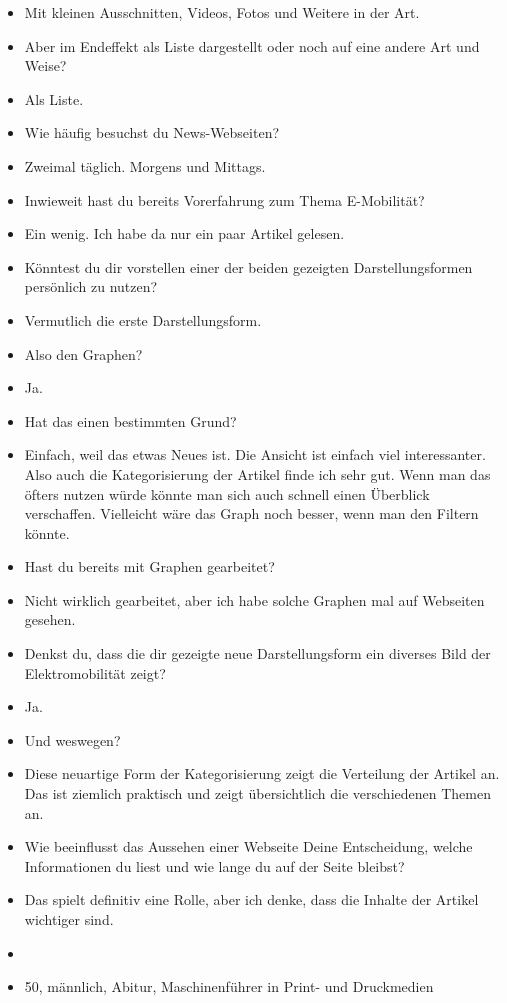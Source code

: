 {\begin{itemize}[]
            \item {} Mit kleinen Ausschnitten, Videos, Fotos und Weitere in der Art.
            \item {} Aber im Endeffekt als Liste dargestellt oder noch auf eine andere Art und Weise?
            \item {} Als Liste.
            \item {} Wie häufig besuchst du News-Webseiten?
            \item {} Zweimal täglich. Morgens und Mittags.
            \item {} Inwieweit hast du bereits Vorerfahrung zum Thema E-Mobilität?
            \item {} Ein wenig. Ich habe da nur ein paar Artikel gelesen.
            \item {} Könntest du dir vorstellen einer der beiden gezeigten Darstellungsformen persönlich zu nutzen?
            \item {} Vermutlich die erste Darstellungsform.
            \item {} Also den Graphen?
            \item {} Ja.
            \item {} Hat das einen bestimmten Grund?
            \item {} Einfach, weil das etwas Neues ist.
                  Die Ansicht ist einfach viel interessanter.
                  Also auch die Kategorisierung der Artikel finde ich sehr gut.
                  Wenn man das öfters nutzen würde könnte man sich auch schnell einen Überblick verschaffen.
                  Vielleicht wäre das Graph noch besser, wenn man den Filtern könnte.
            \item {} Hast du bereits mit Graphen gearbeitet?
            \item {} Nicht wirklich gearbeitet, aber ich habe solche Graphen mal auf Webseiten gesehen.
            \item {} Denkst du, dass die dir gezeigte neue Darstellungsform ein diverses Bild der Elektromobilität zeigt?
            \item {} Ja.
            \item {} Und weswegen?
            \item {} Diese neuartige Form der Kategorisierung zeigt die Verteilung der Artikel an.
                  Das ist ziemlich praktisch und zeigt übersichtlich die verschiedenen Themen an.
            \item {} Wie beeinflusst das Aussehen einer Webseite Deine Entscheidung, welche Informationen du liest und wie lange du auf der Seite bleibst?
            \item {} Das spielt definitiv eine Rolle, aber ich denke, dass die Inhalte der Artikel wichtiger sind.
            \item {}
            \item {} 50, männlich, Abitur, Maschinenführer in Print- und Druckmedien
      \end{itemize}}
\nolinenumbers
